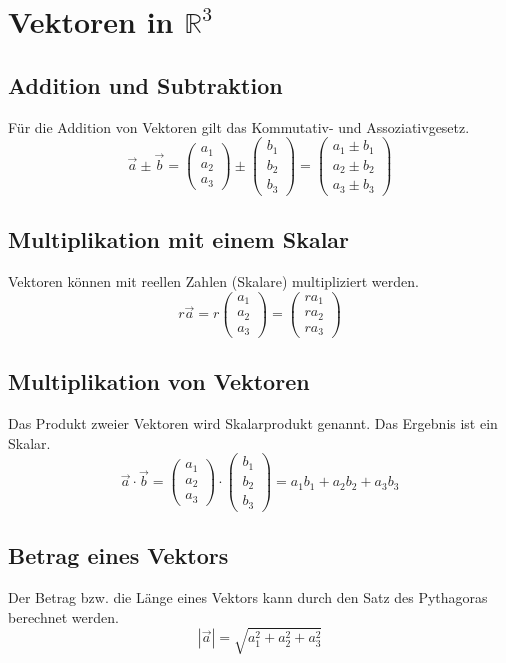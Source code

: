\documentclass[a4paper]{article}
\begin{document}
\section{Vektoren in $\mathbb{R}^3$}
\subsection{Addition und Subtraktion}
Für die Addition von Vektoren gilt das Kommutativ- und Assoziativgesetz.
\[
\vec a \pm \vec b=\begin{pmatrix}a_1\\a_2 \\a_3 \end{pmatrix} \pm \begin{pmatrix}b_1\\b_2 \\b_3 \end{pmatrix}=\begin{pmatrix}a_1 \pm b_1\\a_2 \pm b_2 \\ a_3 \pm b_3 \end{pmatrix} 
\]
\subsection{Multiplikation mit einem Skalar}
Vektoren können mit reellen Zahlen (Skalare) multipliziert werden.
\[
r\vec a=r\begin{pmatrix}a_1\\a_2\\a_3 \end{pmatrix}=\begin{pmatrix}ra_1\\ra_2\\ra_3 \end{pmatrix}
\]
\subsection{Multiplikation von Vektoren}
Das Produkt zweier Vektoren wird Skalarprodukt genannt. Das Ergebnis ist ein Skalar.
\[
\vec a \cdot \vec b=\begin{pmatrix}a_1\\a_2\\a_3 \end{pmatrix} \cdot \begin{pmatrix}b_1\\b_2\\b_3 \end{pmatrix}=a_1b_1+a_2b_2+a_3b_3
\]
\subsection{Betrag eines Vektors}
Der Betrag bzw. die Länge eines Vektors kann durch den Satz des Pythagoras berechnet werden.
\[
|\vec a| = \sqrt{a_1^2 + a_2^2 + a_3^2}
\]
\end{document}
